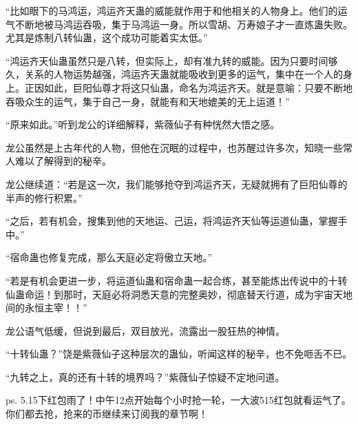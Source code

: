 \begin{this_body}
“比如眼下的马鸿运，鸿运齐天蛊的威能就作用于和他相关的人物身上。他们的运气不断地被马鸿运吞吸，集于马鸿运一身。所以雪胡、万寿娘子才一直炼蛊失败。尤其是炼制八转仙蛊，这个成功可能着实太低。”

“鸿运齐天仙蛊虽然只是八转，但实际上，却有准九转的威能。因为只要时间够久，关系的人物运势越强，鸿运齐天蛊就能吸收到更多的运气，集中在一个人的身上。正因如此，巨阳仙尊才将这只仙蛊，命名为鸿运齐天。就是意喻：只要不断地吞吸众生的运气，集于自己一身，就能有和天地媲美的无上运道！”

“原来如此。”听到龙公的详细解释，紫薇仙子有种恍然大悟之感。

龙公虽然是上古年代的人物，但他在沉眠的过程中，也苏醒过许多次，知晓一些常人难以了解得到的秘辛。

龙公继续道：“若是这一次，我们能够抢夺到鸿运齐天，无疑就拥有了巨阳仙尊的半声的修行积累。”

“之后，若有机会，搜集到他的天地运、己运，将鸿运齐天仙等运道仙蛊，掌握手中。”

“宿命蛊也修复完成，那么天庭必定将傲立天地。”

“若是有机会更进一步，将运道仙蛊和宿命蛊一起合练，甚至能炼出传说中的十转仙蛊命运！到那时，天庭必将洞悉天意的完整奥妙，彻底替天行道，成为宇宙天地间的永恒主宰！！”

龙公语气低缓，但说到最后，双目放光，流露出一股狂热的神情。

“十转仙蛊？”饶是紫薇仙子这种层次的蛊仙，听闻这样的秘辛，也不免咂舌不已。

“九转之上，真的还有十转的境界吗？”紫薇仙子惊疑不定地问道。

ps. 5.15下红包雨了！中午12点开始每个小时抢一轮，一大波515红包就看运气了。你们都去抢，抢来的币继续来订阅我的章节啊！

\end{this_body}

